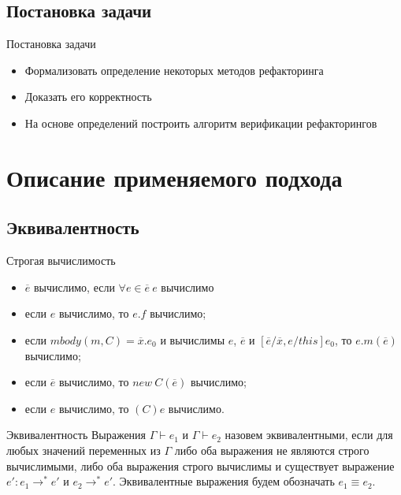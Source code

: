 \documentclass[hyperref=unicode,graphics=pdflatex,13pt]{beamer}
\begin{document}
\subsection{Постановка задачи}
\begin{frame}{Постановка задачи}
\begin{itemize}
    \item Формализовать определение некоторых методов рефакторинга
    \item Доказать его корректность
    \item На основе определений построить алгоритм верификации рефакторингов
\end{itemize}
\end{frame}

\section{Описание применяемого подхода}

\subsection{Эквивалентность}
\begin{frame}{Строгая вычислимость}
\begin{itemize}
    \item $\overline{e}$ вычислимо, если $\forall e \in \overline{e}\ e$ вычислимо
    \item если $e$ вычислимо, то $e.f$ вычислимо;
    \item если $mbody(m, C) = \overline{x}.e_0$ и вычислимы $e$, $\overline{e}$ и $[\overline{e}/\overline{x}, e/this]e_0$, то $e.m(\overline{e})$ вычислимо;
    \item если $\overline{e}$ вычислимо, то $new\ C(\overline{e})$ вычислимо;
    \item если $e$ вычислимо, то $(C) e$ вычислимо.
\end{itemize}
\end{frame}

\begin{frame}{Эквивалентность}
Выражения $\Gamma \vdash e_1$ и $\Gamma \vdash e_2$ назовем эквивалентными, если для любых значений переменных из $\Gamma$ либо оба выражения не являются строго вычислимыми,
либо оба выражения строго вычислимы и существует выражение $e' : e_1 \rightarrow^* e'$ и $e_2 \rightarrow^* e'$. Эквивалентные выражения будем обозначать $e_1 \equiv e_2$.
\end{frame}
\end{document}
